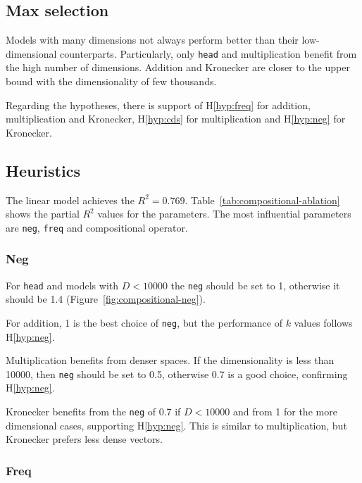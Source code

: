 \subsection{Max selection}
\label{sec:max-selection-compositional}

Models with many dimensions not always perform better than their low-dimensional counterparts. Particularly, only \texttt{head} and multiplication benefit from the high number of dimensions. Addition and Kronecker are closer to the upper bound with the dimensionality of few thousands.



Regarding the hypotheses, there is support of H\ref{hyp:freq} for addition, multiplication and Kronecker, H\ref{hyp:cds} for multiplication and H\ref{hyp:neg} for Kronecker.

\subsection{Heuristics}
\label{sec:heuristics-compositional}

The linear model achieves the $R^2 = 0.769$. Table~\ref{tab:compositional-ablation} shows the partial $R^2$ values for the parameters. The most influential parameters are \texttt{neg}, \texttt{freq} and compositional operator.

\subsubsection{Neg}
\label{sec:neg-compositional}



For \texttt{head} and models with $D < 10000$ the \texttt{neg} should be set to 1, otherwise it should be 1.4 (Figure~\ref{fig:compositional-neg}).

For addition, 1 is the best choice of \texttt{neg}, but the performance of $k$ values follows H\ref{hyp:neg}.

Multiplication benefits from denser spaces. If the dimensionality is less than 10000, then \texttt{neg} should be set to 0.5, otherwise 0.7 is a good choice, confirming H\ref{hyp:neg}.

Kronecker benefits from the \texttt{neg} of 0.7 if $D < 10000$ and from 1 for the more dimensional cases, supporting H\ref{hyp:neg}. This is similar to multiplication, but Kronecker prefers less dense vectors.

\subsubsection{Freq}
\label{sec:freq-compositional}

